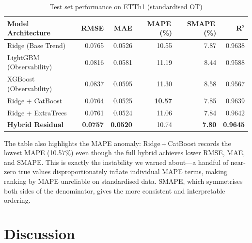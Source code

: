\documentclass[conference]{IEEEtran}
\begin{document}
  \begin{table}[h]
    \centering
    \caption{Test set performance on ETTh1 (standardised OT)}
    \label{tab:hybrid} \scriptsize
    \setlength{\tabcolsep}{3pt}
    \begin{tabular}{lrrrrr}
      \toprule \textbf{Model Architecture} & \textbf{RMSE}  & \textbf{MAE}   & \textbf{MAPE\,(\%)} & \textbf{SMAPE\,(\%)} & \textbf{R$^{2}$}            \\
      \midrule Ridge (Base Trend)          & 0.0765         & 0.0526         & 10.55               & 7.87                 & \phantom{$-$}0.9638         \\
      LightGBM (Observability)             & 0.0816         & 0.0581         & 11.19               & 8.44                 & \phantom{$-$}0.9588         \\
      XGBoost (Observability)              & 0.0837         & 0.0595         & 11.30               & 8.58                 & \phantom{$-$}0.9567         \\
      \midrule Ridge + CatBoost            & 0.0764         & 0.0525         & \textbf{10.57}      & 7.85                 & \phantom{$-$}0.9639         \\
      Ridge + ExtraTrees                   & 0.0761         & 0.0524         & 11.06               & 7.84                 & \phantom{$-$}0.9642         \\
      \midrule \textbf{Hybrid Residual}    & \textbf{0.0757}& \textbf{0.0520}& 10.74               & \textbf{7.80}        & \phantom{$-$}\textbf{0.9645}\\
      \bottomrule
    \end{tabular}
  \end{table}

  The table also highlights the MAPE anomaly: Ridge\,+\,CatBoost records the lowest
  MAPE (10.57\%) even though the full hybrid achieves lower RMSE, MAE, and SMAPE.
  This is exactly the instability we warned about---a handful of near-zero true values
  disproportionately inflate individual MAPE terms, making ranking by MAPE unreliable
  on standardised data. SMAPE, which symmetrises both sides of the denominator, gives
  the more consistent and interpretable ordering.

  \section{Discussion}
  \label{sec:discussion}
\end{document}
